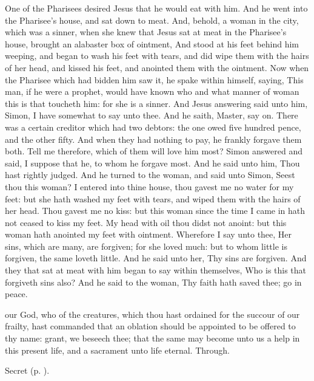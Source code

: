  One of the Pharisees desired Jesus that he would eat with him. And he went into the Pharisee's house, and sat down to meat. And, behold, a woman in the city, which was a sinner, when she knew that Jesus sat at meat in the Pharisee's house, brought an alabaster box of ointment, And stood at his feet behind him weeping, and began to wash his feet with tears, and did wipe them with the hairs of her head, and kissed his feet, and anointed them with the ointment. Now when the Pharisee which had bidden him saw it, he spake within himself, saying, This man, if he were a prophet, would have known who and what manner of woman this is that toucheth him: for she is a sinner. And Jesus answering said unto him, Simon, I have somewhat to say unto thee. And he saith, Master, say on. There was a certain creditor which had two debtors: the one owed five hundred pence, and the other fifty. And when they had nothing to pay, he frankly forgave them both. Tell me therefore, which of them will love him most? Simon answered and said, I suppose that he, to whom he forgave most. And he said unto him, Thou hast rightly judged. And he turned to the woman, and said unto Simon, Seest thou this woman? I entered into thine house, thou gavest me no water for my feet: but she hath washed my feet with tears, and wiped them with the hairs of her head. Thou gavest me no kiss: but this woman since the time I came in hath not ceased to kiss my feet. My head with oil thou didst not anoint: but this woman hath anointed my feet with ointment. Wherefore I say unto thee, Her sins, which are many, are forgiven; for she loved much: but to whom little is forgiven, the same loveth little. And he said unto her, Thy sins are forgiven. And they that sat at meat with him began to say within themselves, Who is this that forgiveth sins also? And he said to the woman, Thy faith hath saved thee; go in peace.


\secret
{} our God, who of the creatures, which thou hast ordained for the succour of our frailty, hast commanded that an oblation should be appointed to be offered to thy name: grant, we beseech thee; that the same may become unto us a help in this present life, and a sacrament unto life eternal. Through.
\begin{rubric}
     Secret  (p. \pageref{AshWednesdayMassSecret}).
\end{rubric}

